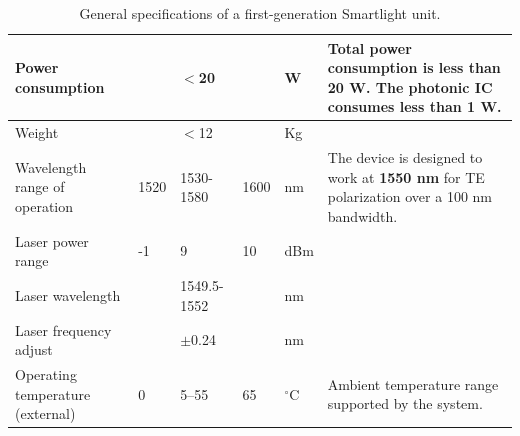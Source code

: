 \begin{table}[h!]
\begin{tabular}{|m{4cm}|m{1.0cm}|m{1.0cm}|m{1.0cm}|m{1.5cm}|m{5.5cm}|}
		\hline
		Power consumption                       &                                     & $<$20                           &                                       & W         & Total power consumption is less than 20 W.
		The photonic IC consumes less than 1 W.
		\\
		\hline
		Weight                                  &                                     & $<$12                           &                                       & Kg        &                                                                                                                                   \\
		\hline
		Wavelength range of operation           & 1520                                & 1530-1580                       & 1600                                  & nm        & The device is designed to work
    at \textbf{1550 nm} for TE polarization over a 100 nm bandwidth.
		\\
		\hline
		Laser power range                       & -1                                  & 9                               & 10                                    & dBm       &                                                                                                                                   \\
		\hline
		Laser wavelength                        &                                     & 1549.5-1552                     &                                       & nm        &                                                                                                                                   \\
		\hline
		Laser frequency adjust                  &                                     & $\pm$0.24                       &                                       & nm        &                                                                                                                                   \\
		\hline
		Operating temperature (external)        & 0                                   & 5–55                          & 65                                    & $^\circ$C & Ambient temperature range supported by the system.                                                                                \\
		\hline
	\end{tabular}
	\caption{General specifications of a first-generation Smartlight unit.}
	\label{tab:ch2-gen-specs}
\end{table}

